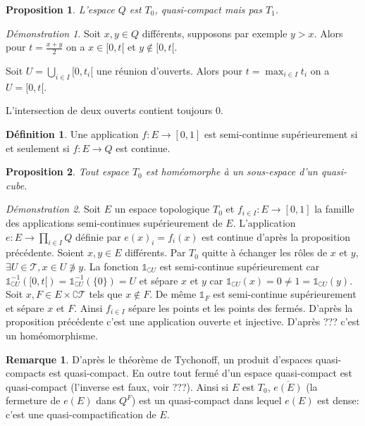 \documentclass[a4paper, 11pt, french]{book}
\newenvironment{itemise}{\itemize}{\enditemize}
\theoremstyle{plain} %
\newtheorem{proposition}{Proposition}
\theoremstyle{definition} %
\newtheorem{definition}{Définition}
\newtheorem{remarque}{Remarque}
\theoremstyle{remark} %
\newtheorem*{demonstration}{Démonstration}
\newcommand{\1}{\mathds{1}}
\newcommand{\inv}[1]{#1^{-1}}
\newcommand{\scr}[1]{\mathscr{#1}}
\begin{document}
\begin{proposition}
	L'espace $Q$ est $T_0$, quasi-compact mais pas $T_1$.
\end{proposition}

\begin{demonstration}
	\begin{itemise}
		\item Soit $x, y\in Q$ différents, supposons par exemple $y>x$.
		Alors pour $t=\frac{x+y}{2}$ on a $x\in[0, t[$ et $y\notin[0, t[$.
		\item Soit $U=\bigcup_{i\in I}[0, t_i[$ une réunion d'ouverts.
		Alors pour $t=\max_{i\in I}t_i$ on a $U=[0,t[$.
		\item L'intersection de deux ouverts contient toujours 0.
	\end{itemise}
\end{demonstration}

\begin{definition}
	Une application $f:E\rightarrow[0, 1]$ est semi-continue supérieurement si et seulement si $f:E\rightarrow Q$ est continue.
\end{definition}

\begin{proposition}
	Tout espace $T_0$ est homéomorphe à un sous-espace d'un quasi-cube.
\end{proposition}

\begin{demonstration}
	Soit $E$ un espace topologique $T_0$ et $f_{i\in I}:E\rightarrow [0, 1]$ la famille des applications semi-continues supérieurement de $E$.
	L'application $e:E\rightarrow \prod_{i\in I}Q$ définie par $e(x)_i=f_i(x)$ est continue d'après la proposition précédente.
	Soient $x, y\in E$ différents.
	Par $T_0$ quitte à échanger les rôles de $x$ et $y$, $\exists U\in\scr{T}, x\in U\not\ni y$.
	La fonction $\1_{\complement U}$ est semi-continue supérieurement car $\inv{\1_{\complement U}}([0, t[)=\inv{\1_{\complement U}}(\{0\})=U$ et sépare $x$ et $y$ car $\1_{\complement U}(x)=0\neq1=\1_{\complement U}(y)$.
	Soit $x, F\in E\times\complement\scr{T}$ tels que $x\notin F$.
	De même $\1_F$ est semi-continue supérieurement et sépare $x$ et $F$.
	Ainsi $f_{i\in I}$ sépare les points et les points des fermés.
	D'après la proposition précédente c'est une application ouverte et injective.
	D'après {\color{red} ???} c'est un homéomorphisme.
\end{demonstration}

\begin{remarque}
	D'après le théorème de Tychonoff, un produit d'espaces quasi-compacts est quasi-compact.
	En outre tout fermé d'un espace quasi-compact  est quasi-compact (l'inverse est faux, voir {\color{red} ???}).
	Ainsi si $E$ est $T_0$, $\overline{e(E)}$ (la fermeture de $e(E)$ dans $Q^F$) est un quasi-compact dans lequel $e(E)$ est dense: c'est une quasi-compactification de $E$.
\end{remarque}
\end{document}
